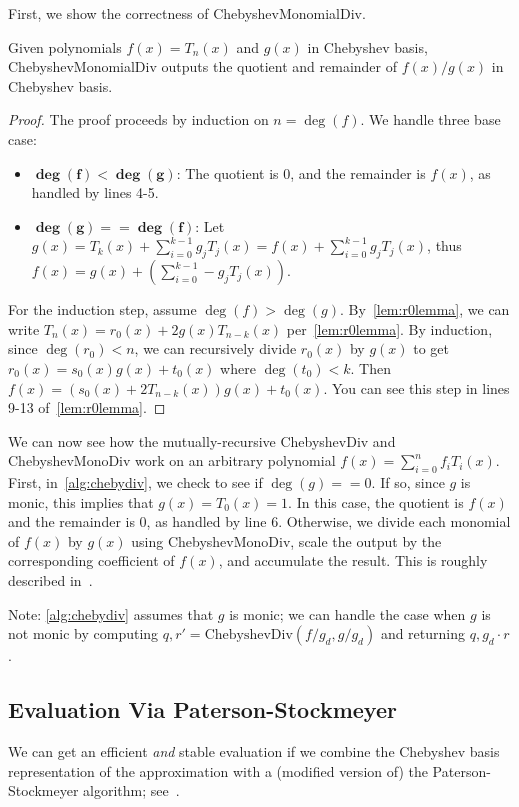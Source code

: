 \documentclass[../fheimpl.tex]{subfiles}
\begin{document}
First, we show the correctness of \textrm{ChebyshevMonomialDiv}.
\begin{lemma}
	\label{lem:chebymonodiv}
	Given polynomials $f(x)=T_n(x)$ and $g(x)$ in Chebyshev basis, \textrm{ChebyshevMonomialDiv} outputs the quotient and remainder of $f(x)/g(x)$ in Chebyshev basis.
\end{lemma}
\begin{proof}
	The proof proceeds by induction on $n=\deg(f)$. We handle three base case:
	\begin{itemize}
		
		\item $\bm{\deg(f) < \deg(g)}$: The quotient is 0, and the remainder is $f(x)$, as handled by lines 4-5.
		
		\item $\bm{\deg(g) == \deg(f)}$: Let $g(x) = T_k(x) + \sum_{i=0}^{k-1}g_jT_j(x) = f(x) + \sum_{i=0}^{k-1}g_jT_j(x)$, thus $f(x) = g(x) + \left(\sum_{i=0}^{k-1}-g_jT_j(x)\right)$.
	\end{itemize}
	
	For the induction step, assume $\deg(f) > \deg(g)$. By~\cref{lem:r0lemma}, we can write $T_n(x) = r_0(x) + 2g(x)T_{n-k}(x)$ per~\cref{lem:r0lemma}. By induction, since $\deg(r_0)<n$, we can recursively divide $r_0(x)$ by $g(x)$ to get $r_0(x) = s_0(x)g(x)+t_0(x)$ where $\deg(t_0)<k$. Then $f(x) = (s_0(x)+2T_{n-k}(x))g(x)+t_0(x)$. You can see this step in lines 9-13 of~\cref{lem:r0lemma}.
\end{proof}

We can now see how the mutually-recursive \textrm{ChebyshevDiv} and \textrm{ChebyshevMonoDiv} work on an arbitrary polynomial $f(x)=\sum_{i=0}^n f_iT_i(x)$. First, in~\cref{alg:chebydiv}, we check to see if $\deg(g) == 0$. If so, since $g$ is monic, this implies that $g(x)=T_0(x)=1$. In this case, the quotient is $f(x)$ and the remainder is 0, as handled by line 6. Otherwise, we divide each monomial of $f(x)$ by $g(x)$ using \textrm{ChebyshevMonoDiv}, scale the output by the corresponding coefficient of $f(x)$, and accumulate the result. This is roughly described in~\cite{cryptoeprint:2018/1043}.

Note: \cref{alg:chebydiv} assumes that $g$ is monic; we can handle the case when $g$ is not monic by computing $q,r' = \textrm{ChebyshevDiv}(f/g_d, g/g_d)$ and returning $q, g_d\cdot r$.

\subsection{Evaluation Via Paterson-Stockmeyer}
We can get an efficient \emph{and} stable evaluation if we combine the Chebyshev basis representation of the approximation with a (modified version of) the Paterson-Stockmeyer algorithm; see~\cite{cryptoeprint:2018/1043}.
\end{document}
